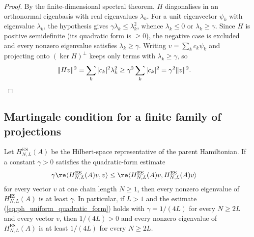 \begin{proof}
    \leanok
    By the finite-dimensional spectral theorem, $H$ diagonalises in an
    orthonormal eigenbasis with real eigenvalues $\lambda_k$. For a unit
    eigenvector $\psi_k$ with eigenvalue $\lambda_k$, the hypothesis gives
    $\gamma\lambda_k\le\lambda_k^2$, whence $\lambda_k\le0$ or
    $\lambda_k\ge\gamma$. Since $H$ is positive semidefinite
    (its quadratic form is $\ge0$), the negative case is excluded and
    every nonzero eigenvalue satisfies $\lambda_k\ge\gamma$. Writing
    $v=\sum_k c_k\psi_k$ and projecting onto $(\ker H)^\perp$ keeps only
    terms with $\lambda_k\ge\gamma$, so
    \begin{align}
        \|Hv\|^2
         & =\sum_k|c_k|^2\lambda_k^2 \ge\gamma^2\sum_k|c_k|^2 =\gamma^2\|v\|^2. \notag
    \end{align}
\end{proof}

\subsection{Martingale condition for a finite family of projections}
\label{subsec:spectral_gap_rowsum}

\begin{lemma}
    \label{lem:parent_hamiltonian_es_quadratic_reduction}
    \leanok
    Let $H_{N,L}^{\mathrm{ES}}(A)$ be the Hilbert-space representative of the
    parent Hamiltonian. If a constant $\gamma>0$ satisfies the
    quadratic-form estimate
    \begin{align}
        \gamma\re\langle H_{N,L}^{\mathrm{ES}}(A)v,v\rangle
         & \le
        \re\langle H_{N,L}^{\mathrm{ES}}(A)v,
        H_{N,L}^{\mathrm{ES}}(A)v\rangle
        \label{eq:ph_uniform_quadratic_form}
    \end{align}
    for every vector $v$ at one chain length $N\geq1$, then every nonzero
    eigenvalue of $H_{N,L}^{\mathrm{ES}}(A)$ is at least $\gamma$. In
    particular, if $L>1$ and the estimate
    (\ref{eq:ph_uniform_quadratic_form}) holds with $\gamma=1/(4L)$ for
    every $N\ge2L$ and every vector $v$, then $1/(4L)>0$ and every nonzero
    eigenvalue of $H_{N,L}^{\mathrm{ES}}(A)$ is at least $1/(4L)$ for every
    $N\ge2L$.
\end{lemma}

